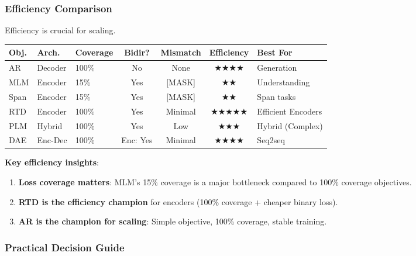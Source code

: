 \documentclass{article}
\begin{document}
\subsubsection{Efficiency Comparison}

Efficiency is crucial for scaling.

\begin{center}
\begin{tabular}{@{}lllcccl@{}}
\toprule
\textbf{Obj.} & \textbf{Arch.} & \textbf{Coverage} & \textbf{Bidir?} & \textbf{Mismatch} & \textbf{Efficiency} & \textbf{Best For} \\
\midrule
AR & Decoder & 100\% & No & None & $\bigstar\bigstar\bigstar\bigstar$ & Generation \\
MLM & Encoder & 15\% & Yes & [MASK] & $\bigstar\bigstar$ & Understanding \\
Span & Encoder & 15\% & Yes & [MASK] & $\bigstar\bigstar$ & Span tasks \\
RTD & Encoder & 100\% & Yes & Minimal & $\bigstar\bigstar\bigstar\bigstar\bigstar$ & Efficient Encoders \\
PLM & Hybrid & 100\% & Yes & Low & $\bigstar\bigstar\bigstar$ & Hybrid (Complex) \\
DAE & Enc-Dec & 100\% & Enc: Yes & Minimal & $\bigstar\bigstar\bigstar\bigstar$ & Seq2seq \\
\bottomrule
\end{tabular}
\end{center}

\textbf{Key efficiency insights}:

\begin{enumerate}
\item \textbf{Loss coverage matters}: MLM's 15\% coverage is a major bottleneck compared to 100\% coverage objectives.
\item \textbf{RTD is the efficiency champion} for encoders (100\% coverage + cheaper binary loss).
\item \textbf{AR is the champion for scaling}: Simple objective, 100\% coverage, stable training.
\end{enumerate}

\subsubsection{Practical Decision Guide}
\end{document}
